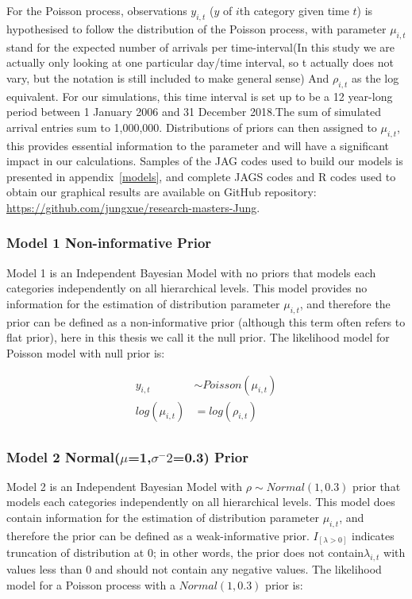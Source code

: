 For the Poisson process, observations $y_{i,t}$ ($y$ of $i$th category given time $t$) is hypothesised to follow the distribution of the Poisson process, with parameter $\mu_{i,t}$ stand for the expected number of arrivals per time-interval(In this study we are actually only looking at one particular day/time interval, so t actually does not vary, but the notation is still included to make general sense) And $\rho_{i,t}$ as the log equivalent. For our simulations, this time interval is set up to be a 12 year-long period between 1 January 2006 and 31 December 2018.The sum of simulated arrival entries sum to 1,000,000. Distributions of priors can then assigned to $\mu_{i,t}$, this provides essential information to the parameter and will have a significant impact in our calculations. Samples of the JAG codes used to build our models is presented in appendix~\ref{models}, and complete JAGS codes and R codes used to obtain our graphical results are available on GitHub repository:
\href{https://github.com/jungxue/research-masters-Jung}{https://github.com/jungxue/research-masters-Jung}. 

\subsubsection{Model 1 Non-informative Prior}

Model 1 is an Independent Bayesian Model with no priors that models each categories independently on all hierarchical levels. This model provides no information for the estimation of distribution parameter $\mu_{i,t}$, and therefore the prior can be defined as a non-informative prior (although this term often refers to flat prior), here in this thesis we call it the null prior. The likelihood model for Poisson model with null prior is:

\begin{equation*} \label{Poissonm1}
\begin{aligned}
y_{i,t} & \sim Poisson(\mu_{i,t}) \\  
log(\mu_{i,t}) & = log(\rho_{i,t}) \\
\end{aligned}
\end{equation*}

\subsubsection{Model 2 Normal($\mu$=1,$\sigma^-2$=0.3) Prior}

Model 2 is an Independent Bayesian Model with $\rho \sim Normal(1, 0.3)$ prior that models each categories independently on all hierarchical levels. This model does contain information for the estimation of distribution parameter $\mu_{i,t}$, and therefore the prior can be defined as a weak-informative prior. $I_{[\lambda>0]}$ indicates truncation of distribution at 0; in other words, the prior does not contain$\lambda_{i,t}$ with values less than 0 and should not contain any negative values. The likelihood model for a Poisson process with a $Normal(1, 0.3)$ prior is:


